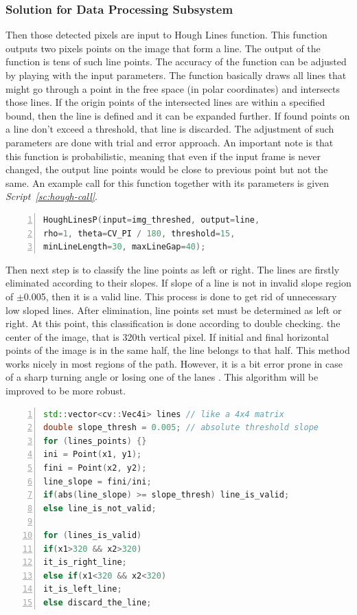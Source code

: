 \documentclass[a4paper,12pt]{article}
\begin{document}
		\subsubsection{Solution for Data Processing Subsystem}
	Then those detected pixels are input to Hough Lines function. This function outputs two pixels points on the image that form a line. The output of the function is tens of such line points. The accuracy of the function can be adjusted by playing with the input parameters. The function basically draws all lines that might go through a point in the free space (in polar coordinates) and intersects those lines. If the origin points of the intersected lines are within a specified bound, then the line is defined and it can be expanded further. If found points on a line don't exceed a threshold, that line is discarded. The adjustment of such parameters are done with trial and error approach. An important note is that this function is probabilistic, meaning that even if the input frame is never changed, the output line points would be close to previous point but not the same. An example call for this function together with its parameters is given \textit{Script~\ref{sc:hough-call}}.

\begin{lstlisting}[language=C++,float=t,numbers=left,frame=single,caption=Hough Lines Function with its Parameters, captionpos=b, label=sc:hough-call]
HoughLinesP(input=img_threshed, output=line,
rho=1, theta=CV_PI / 180, threshold=15, 
minLineLength=30, maxLineGap=40);
\end{lstlisting}
Then next step is to classify the line points as left or right. The lines are firstly eliminated according to their slopes. If slope of a line is not in invalid slope region of $\pm$0.005, then it is a valid line. This process is done to get rid of unnecessary low sloped lines. After elimination, line points set must be determined as left or right. At this point, this classification is done according to double checking. the center of the image, that is 320th vertical pixel. If initial and final horizontal points of the image is in the same half, the line belongs to that half. This method works nicely in most regions of the path. However, it is a bit error prone in case of a sharp turning angle or losing one of the lanes . This algorithm will be improved to be more robust.
\begin{lstlisting}[language=C++,float=t,numbers=left,frame=single,caption=The Algorithm to Classify the Lane Lines as Right or Left, captionpos=b, label=sc:left-right-lines]
std::vector<cv::Vec4i> lines // like a 4x4 matrix
double slope_thresh = 0.005; // absolute threshold slope
for (lines_points) {}
ini = Point(x1, y1);
fini = Point(x2, y2);
line_slope = fini/ini;
if(abs(line_slope) >= slope_thresh) line_is_valid;
else line_is_not_valid;

for (lines_is_valid)	
if(x1>320 && x2>320)
it_is_right_line;
else if(x1<320 && x2<320)
it_is_left_line;
else discard_the_line;
\end{lstlisting}
\end{document}
